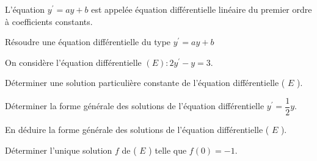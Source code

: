 \begin{bprop}
\pointilles[\textwidth-0.5cm]

\pointilles[\textwidth-0.5cm]
\end{bprop}

\begin{bdemo}
\end{bdemo}

\begin{bprop}
	\pointilles[\textwidth-0.5cm]
	
	\pointilles[\textwidth-0.5cm]
	
	\pointilles[\textwidth-0.5cm]
	
	\pointilles[\textwidth-0.5cm]
\end{bprop}

\begin{brmq}
	L'équation $y^{\prime}=a y+b$ est appelée équation différentielle linéaire du premier ordre à coefficients constants.
\end{brmq}
\begin{bmethodet}{Résoudre une équation différentielle du type $y^{\prime}=a y+b$}
	
	On considère l'équation différentielle $(E): 2 y^{\prime}-y=3$.
	\begin{enumMet}
		\item Déterminer une solution particulière constante de l'équation différentielle ( $E$ ).\\
		\item Déterminer la forme générale des solutions de l'équation différentielle $y^{\prime}=\dfrac{1}{2} y$.\\
		\item En déduire la forme générale des solutions de l'équation différentielle ( $E$ ).\\
		\item Déterminer l'unique solution $f$ de ( $E$ ) telle que $f(0)=-1$.
	\end{enumMet}
	
\end{bmethodet}
